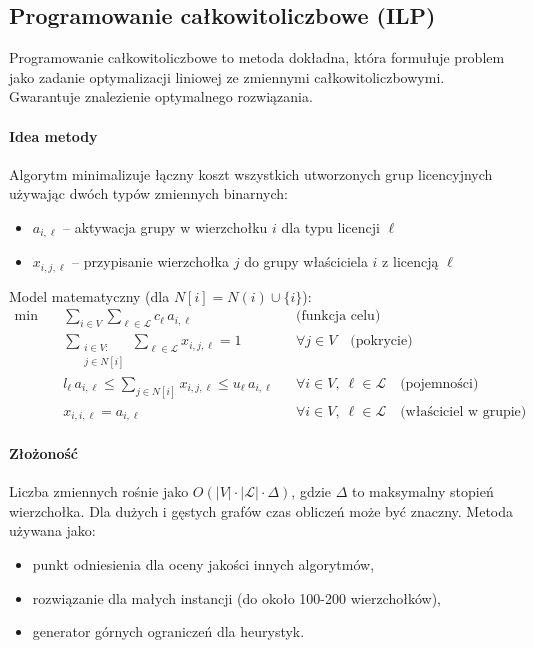 \subsection{Programowanie całkowitoliczbowe (ILP)}\label{subsec:ilp}

Programowanie całkowitoliczbowe to metoda dokładna, która formułuje problem jako zadanie optymalizacji liniowej ze zmiennymi całkowitoliczbowymi. Gwarantuje znalezienie optymalnego rozwiązania.

\paragraph{Idea metody}
Algorytm minimalizuje łączny koszt wszystkich utworzonych grup licencyjnych używając dwóch typów zmiennych binarnych:
\begin{itemize}
  \item $a_{i,\ell}$ -- aktywacja grupy w wierzchołku $i$ dla typu licencji $\ell$
  \item $x_{i,j,\ell}$ -- przypisanie wierzchołka $j$ do grupy właściciela $i$ z licencją $\ell$
\end{itemize}

Model matematyczny (dla $N[i] = N(i) \cup \{i\}$):
\begin{align}
  \min\quad & \sum_{i\in V}\sum_{\ell\in\mathcal{L}} c_\ell\, a_{i,\ell}                    &  & \text{(funkcja celu)}                                                  \\[4pt]
            & \sum_{\substack{i\in V:                                                                                                                                   \\ j\in N[i]}}\sum_{\ell\in\mathcal{L}} x_{i,j,\ell} = 1 && \forall j\in V \quad \text{(pokrycie)} \\[2pt]
            & l_\ell\, a_{i,\ell} \le \sum_{j\in N[i]} x_{i,j,\ell} \le u_\ell\, a_{i,\ell} &  & \forall i\in V,\ \ell\in\mathcal{L} \quad \text{(pojemności)}          \\[2pt]
            & x_{i,i,\ell} = a_{i,\ell}                                                     &  & \forall i\in V,\ \ell\in\mathcal{L} \quad \text{(właściciel w grupie)}
\end{align}

\paragraph{Złożoność}
Liczba zmiennych rośnie jako $O(|V| \cdot |\mathcal{L}| \cdot \Delta)$, gdzie $\Delta$ to maksymalny stopień wierzchołka. Dla dużych i gęstych grafów czas obliczeń może być znaczny. Metoda używana jako:
\begin{itemize}
  \item punkt odniesienia dla oceny jakości innych algorytmów,
  \item rozwiązanie dla małych instancji (do około 100-200 wierzchołków),
  \item generator górnych ograniczeń dla heurystyk.
\end{itemize}

